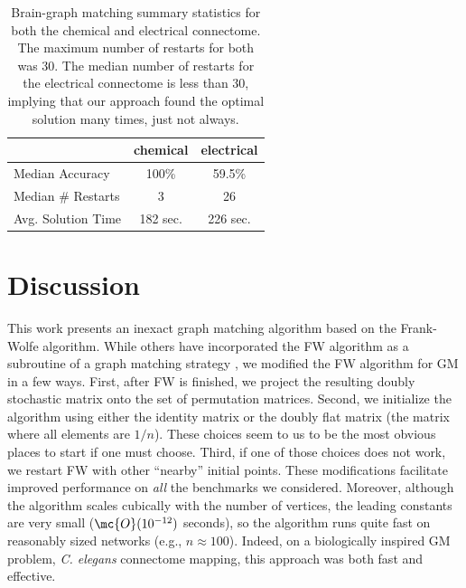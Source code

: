 \documentclass[10pt,journal,cspaper,compsoc]{IEEEtran}
\begin{document}
\begin{table}
\caption{Brain-graph matching summary statistics for both the chemical and electrical connectome.  The maximum number of restarts for both was 30.  The median number of restarts for the electrical connectome is less than 30, implying that our approach found the optimal solution many times, just not always.}
	\label{tab:1}
\begin{center}
\begin{tabular}{|l|c|c|}
\hline	 					& chemical 		& electrical  \\ \hline
	Median Accuracy    &       100\%            &             59.5\% \\
	Median \# Restarts  &         3            &                   26 \\
	Avg. Solution Time     &      182 sec.      &                226 sec. \\ \hline
\end{tabular} 
\end{center}
\end{table}

 


\section{Discussion}

This work presents an inexact graph matching algorithm based on the Frank-Wolfe algorithm.  While others have incorporated the FW algorithm as a subroutine of a graph matching strategy \cite{Zaslavskiy2009}, we modified the FW algorithm for GM in a few ways.  First, after FW is finished, we project the resulting doubly stochastic matrix onto the set of permutation matrices.  Second, we initialize the algorithm using either the identity matrix or the doubly flat matrix (the matrix where all elements are $1/n$).  These choices seem to us to be the most obvious places to start if one must choose.  Third, if one of those choices does not work, we restart FW with other ``nearby'' initial points.  These modifications facilitate improved performance on \emph{all} the benchmarks we considered.  Moreover, although the algorithm scales cubically with the number of vertices, the leading constants are very small ($\mc{O}(10^{-12})$ seconds), so the algorithm runs quite fast on reasonably sized networks (e.g., $n \approx 100$).  Indeed, on a biologically inspired GM problem, \emph{C. elegans} connectome mapping, this approach was both fast and effective.  
\end{document}
